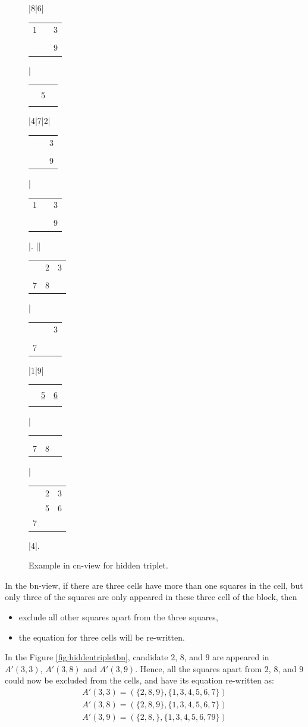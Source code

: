 \documentclass[11pt]{report}
\newcommand{\cell}[9]{%
\scriptsize
\setlength{\tabcolsep}{1pt}
\renewcommand{\arraystretch}{0.5}
\hspace{-0.6em}
\begin{tabular}{ccc}
#1 & #2 & #3\\
#4 & #5 & #6\\
#7 & #8 & #9
\end{tabular}
}
\newcommand{\set}[1]{\{ #1 \}}
\begin{document}
\begin{figure}[htbp]
\begin{sudoku}
|{8}|6|{\cell 1{}3{}{}{}{}{}9}|{\cell {}{}{}{}5{}{}{}{}}|4|7|2|{\cell {}{}3{}{}{}{}{}9}|{\cell 1{}3{}{}{}{}{}9}|.
|{\makebox[0pt]{\hspace{-2.1em}\large c9}{\cell {}2{}{}56{}{}{}}}|{\cell {}23{}{}{}78{}}|{\cell {}{}3{}{}{}7{}{}}|1|9|{\cell {}{}{}{}{\underline 5}{\underline 6}{}{}{}}|{\cell {}{}{}{}{}{}78{}}|{\cell {}23{}567{}{}}|4|.
\end{sudoku}
\caption{Example in cn-view for hidden triplet.}
\label{fig:hiddentripletcn}
\end{figure}

In the bn-view, if there are three cells have more than one squares in the cell, but only three of the squares are only appeared in these three cell of the block, then
\begin{itemize}
\item exclude all other squares apart from the three squares,
\item the equation for three cells will be re-written.
\end{itemize}

In the Figure \ref{fig:hiddentripletbn}, candidate $2$, $8$, and $9$ are appeared in $A'(3,3)$, $A'(3,8)$ and $A'(3,9)$. Hence, all the squares apart from $2$, $8$, and $9$ could now be excluded from the cells, and have its equation re-written as:
\begin{eqnarray*}
A'(3,3) = (\set{2, 8, 9}, \set{1, 3, 4, 5, 6, 7})\\
A'(3,8) = (\set{2, 8, 9}, \set{1, 3, 4, 5, 6, 7})\\
A'(3,9) = (\set{2, 8,}, \set{1, 3, 4, 5, 6, 7 9})\\
\end{eqnarray*}
\end{document}
